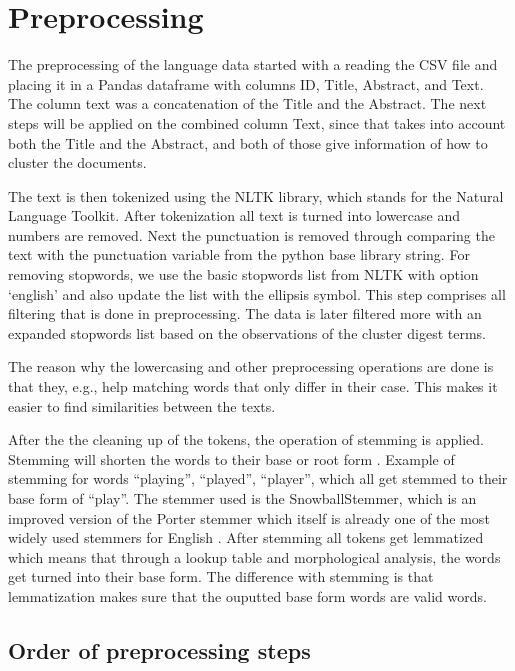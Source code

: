 \section{Preprocessing}

The preprocessing of the language data started with a reading the CSV file and placing it in a Pandas dataframe with columns ID, Title, Abstract, and Text. The column text was a concatenation of the Title and the Abstract. The next steps will be applied on the combined column Text, since that takes into account both the Title and the Abstract, and both of those give information of how to cluster the documents.

The text is then tokenized using the NLTK library, which stands for the Natural Language Toolkit. After tokenization all text is turned into lowercase and numbers are removed. Next the punctuation is removed through comparing the text with the punctuation variable from the python base library string. For removing stopwords, we use the basic stopwords list from NLTK with option `english' and also update the list with the ellipsis symbol. This step comprises all filtering that is done in preprocessing. The data is later filtered more with an expanded stopwords list based on the observations of the cluster digest terms.


The reason why the lowercasing and other preprocessing operations are done is that they, e.g., help matching words that only differ in their case. This makes it easier to find similarities between the texts.


After the the cleaning up of the tokens, the operation of stemming is applied. Stemming will shorten the words to their base or root form \autocite[pages 431--434]{aggarwal2015data}. Example of stemming for words ``playing'', ``played'', ``player'', which all get stemmed to their base form of ``play''. The stemmer used is the SnowballStemmer, which is an improved version of the Porter stemmer which itself is already one of the most widely used stemmers for English \autocite{porter1980algorithm}. After stemming all tokens get lemmatized which means that through a lookup table and morphological analysis, the words get turned into their base form. The difference with stemming is that lemmatization makes sure that the ouputted base form words are valid words.




\subsection{Order of preprocessing steps}

